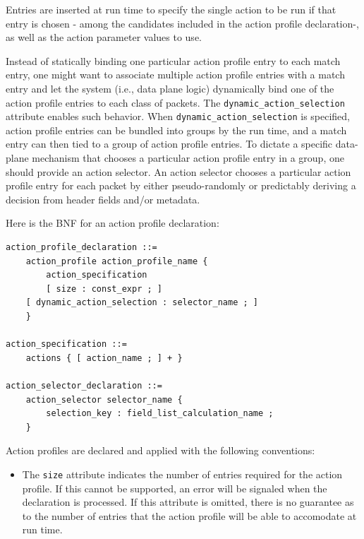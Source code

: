 \documentclass[12pt]{article}
\begin{document}
Entries are inserted at run time to specify the single action to be run if that
entry is chosen - among the candidates included in the action profile
declaration-, as well as the action parameter values to use.

Instead of statically binding one particular action profile entry to each match
entry, one might want to associate multiple action profile entries with a match
entry and let the system (i.e., data plane logic) dynamically bind one of the
action profile entries to each class of packets. The
\texttt{dynamic_action_selection} attribute enables such behavior. When
\texttt{dynamic_action_selection} is specified, action profile entries can be
bundled into groups by the run time, and a match entry can then tied to a group
of action profile entries. To dictate a specific data-plane mechanism that
chooses a particular action profile entry in a group, one should provide an
action selector. An action selector chooses a particular action profile entry
for each packet by either pseudo-randomly or predictably deriving a decision
from header fields and/or metadata.

Here is the BNF for an action profile declaration:

\begin{lstlisting}[style=BNFstyle]
action_profile_declaration ::=
    action_profile action_profile_name {
        action_specification
        [ size : const_expr ; ]
	[ dynamic_action_selection : selector_name ; ]
    }

action_specification ::= 
    actions { [ action_name ; ] + }

action_selector_declaration ::=
    action_selector selector_name {
        selection_key : field_list_calculation_name ;
    }
\end{lstlisting}

Action profiles are declared and applied with the following conventions:

\begin{itemize}
\item
The \texttt{size} attribute indicates the number of entries required for the
action profile. If this cannot be supported, an error will be signaled when the
declaration is processed. If this attribute is omitted, there is no guarantee as
to the number of entries that the action profile will be able to accomodate at
run time.
\end{itemize}


\end{document}
